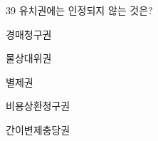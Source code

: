 \begin{question}{39}
유치권에는 인정되지 않는 것은?
\begin{choices}
  \item 경매청구권
  \item 물상대위권
  \item 별제권
  \item 비용상환청구권
  \item 간이변제충당권
\end{choices}
\end{question}
